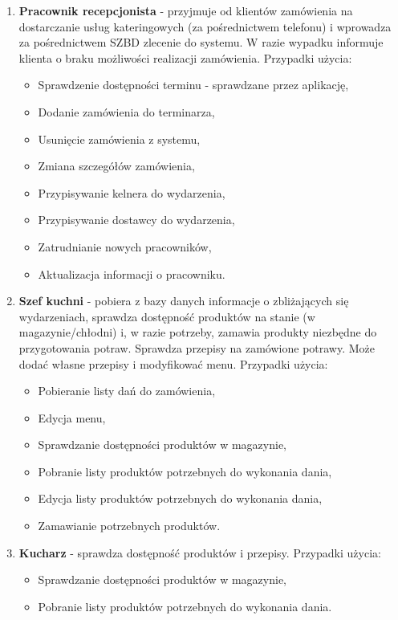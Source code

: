 \documentclass[12pt]{article}
\begin{document}
\begin{enumerate}
    \item \textbf{Pracownik recepcjonista} - przyjmuje od klientów zamówienia na dostarczanie usług kateringowych (za pośrednictwem telefonu) i wprowadza za pośrednictwem SZBD zlecenie do systemu. W razie wypadku informuje klienta o braku możliwości realizacji zamówienia. Przypadki użycia:
    \begin{itemize}
        \item Sprawdzenie dostępności terminu - sprawdzane przez aplikację,
        \item Dodanie zamówienia do terminarza,
        \item Usunięcie zamówienia z systemu,
        \item Zmiana szczegółów zamówienia,
        \item Przypisywanie kelnera do wydarzenia,
        \item Przypisywanie dostawcy do wydarzenia,
        \item Zatrudnianie nowych pracowników,
        \item Aktualizacja informacji o pracowniku.
    \end{itemize}

    \item \textbf{Szef kuchni} - pobiera z bazy danych informacje o zbliżających się wydarzeniach, sprawdza dostępność produktów na stanie (w magazynie/chłodni) i, w razie potrzeby, zamawia produkty niezbędne do przygotowania potraw. Sprawdza przepisy na zamówione potrawy. Może dodać własne przepisy i modyfikować menu. Przypadki użycia:
    \begin{itemize}
        \item Pobieranie listy dań do zamówienia,
        \item Edycja menu,
        \item Sprawdzanie dostępności produktów w magazynie,
        \item Pobranie listy produktów potrzebnych do wykonania dania,
        \item Edycja listy produktów potrzebnych do wykonania dania,
        \item Zamawianie potrzebnych produktów.
    \end{itemize}
    
    \item \textbf{Kucharz} - sprawdza dostępność produktów i przepisy. Przypadki użycia:
    \begin{itemize}
        \item Sprawdzanie dostępności produktów w magazynie,
        \item Pobranie listy produktów potrzebnych do wykonania dania.
    \end{itemize}
    

\end{enumerate}
\end{document}
